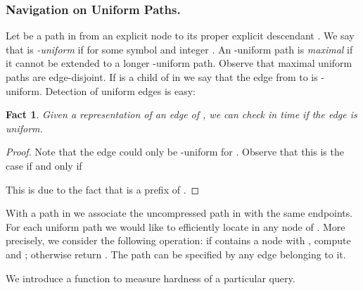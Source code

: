 \documentclass[a4paper]{article}
\newtheorem{fact}[theorem]{Fact}
\theoremstyle{remark}
\begin{document}
\newcommand{\tpath}{\mathtt{path}}
\subsubsection{Navigation on Uniform Paths.}
Let  be a path in  from an explicit node  to its proper explicit descendant .
We say that  is \emph{-uniform} if  for some symbol  and integer .
An -uniform path is \emph{maximal} if it cannot be extended to a longer -uniform path.
Observe that maximal uniform paths are edge-disjoint.
If  is a child of  in  we say that the edge from  to  is -uniform.
Detection of uniform edges is easy:
\begin{fact}\label{fct:unicheck}
Given a representation  of an edge of , we can check in  time if
the edge is uniform.
\end{fact}
\begin{proof}
Note that the edge could only be -uniform for .
Observe that this is the case if and only if

This is due to the fact that  is a prefix of .
\end{proof}


\newcommand{\tlocate}{\mathtt{locate}}
With a path  in  we associate the uncompressed path  in 
with the same endpoints.
For each uniform path  we would like to efficiently locate in  any node of .
More precisely, we consider the following  operation: if  contains
a node  with , compute  and ; otherwise return .
The path  can be specified by any edge belonging to it.

We introduce a function 
to measure hardness of a particular query.
\end{document}
